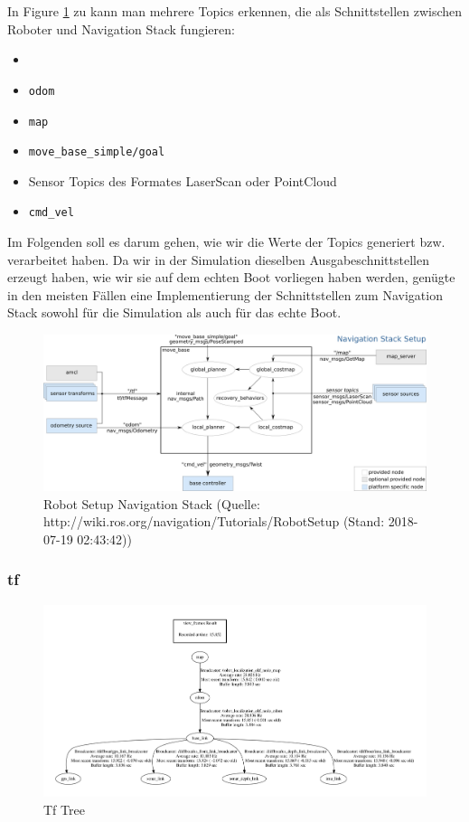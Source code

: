 \documentclass[11pt]{article}
\begin{document}
In Figure \ref{nav} zu kann man mehrere Topics erkennen, die als Schnittstellen zwischen Roboter und Navigation Stack fungieren:
\begin{itemize}
	\item \texttt{
	}
	\item \texttt{odom}
	\item \texttt{map}
	\item \texttt{move\_base\_simple/goal}
	\item Sensor Topics des Formates LaserScan oder PointCloud
	\item \texttt{cmd\_vel}
\end{itemize}
Im Folgenden soll es darum gehen, wie wir die Werte der Topics generiert bzw. verarbeitet haben. Da wir in der Simulation dieselben Ausgabeschnittstellen erzeugt haben, wie wir sie auf dem echten Boot vorliegen haben werden, genügte in den meisten Fällen eine Implementierung der Schnittstellen zum Navigation Stack sowohl für die Simulation als auch für das echte Boot.

\begin{figure}
	\includegraphics[width=\linewidth]{overview_tf.png}
	\caption{Robot Setup Navigation Stack (Quelle: http://wiki.ros.org/navigation/Tutorials/RobotSetup (Stand: 2018-07-19 02:43:42))}
	\label{nav}
\end{figure}

\subsubsection{tf}

\begin{figure}
	\includegraphics[width=\linewidth]{frames.png}
	\caption{Tf Tree}
	\label{frames}
\end{figure}
\end{document}

